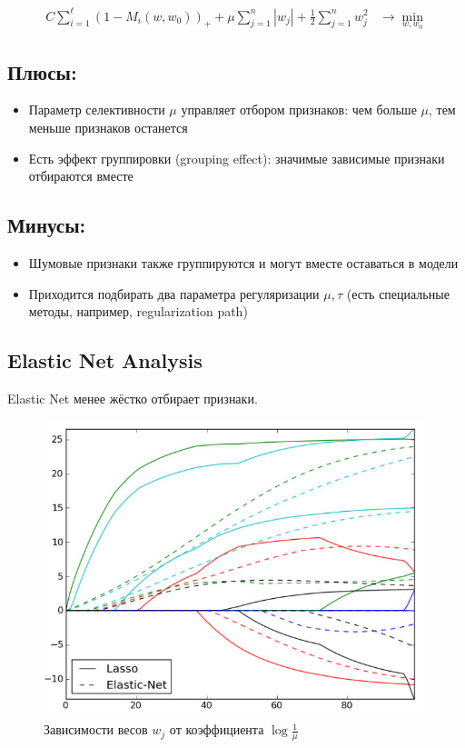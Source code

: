 \begin{align*}
    C \sum_{i=1}^{\ell} \left(1 - M_i(w, w_0)\right)_+ + \mu \sum_{j=1}^{n} |w_j| + \frac{1}{2} \sum_{j=1}^{n} w_j^2 & \rightarrow \min_{w, w_0}
\end{align*}

\subsection*{Плюсы:}
\begin{itemize}
    \item Параметр селективности \(\mu\) управляет отбором признаков: чем больше \(\mu\), тем меньше признаков останется
    \item Есть эффект группировки (grouping effect): значимые зависимые признаки отбираются вместе
\end{itemize}

\subsection*{Минусы:}
\begin{itemize}
    \item Шумовые признаки также группируются и могут вместе оставаться в модели
    \item Приходится подбирать два параметра регуляризации \(\mu, \tau\) (есть специальные методы, например, regularization path)
\end{itemize}

\subsection{Elastic Net Analysis}

Elastic Net менее жёстко отбирает признаки.

\begin{figure}[h]
    \centering
    \includegraphics[width=0.8\linewidth]{chapters/svm/images/Elastic_Net.png}
    \caption{Зависимости весов \(w_j\) от коэффициента \(\log \frac{1}{\mu}\)}
    \label{fig:mpr}
\end{figure}

